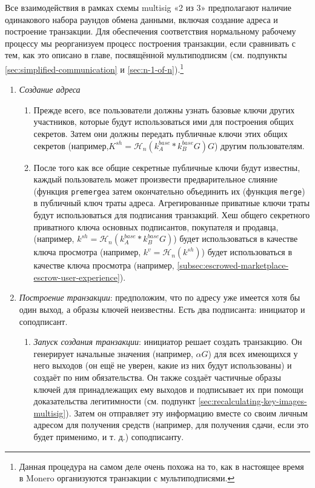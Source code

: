 Все взаимодействия в рамках схемы multisig «2 из 3» предполагают наличие одинакового набора раундов обмена данными, включая создание адреса и построение транзакции. Для обеспечения соответствия нормальному рабочему процессу мы реорганизуем процесс построе\-ния транзакции, если сравнивать с тем, как это описано в главе, посвящённой мультиподписям (см. подпункты \ref{sec:simplified-communication} и \ref{sec:n-1-of-n}).\footnote{Данная процедура на самом деле очень похожа на то, как в настоящее время в Monero организуются транзакции с мультиподписями.}
\begin{enumerate}
    \item {\em Создание адреса}
    \begin{enumerate}
        \item Прежде всего, все пользователи должны узнать базовые ключи других участников, которые будут использоваться ими для построения общих секретов. Затем они должны передать публичные ключи этих общих секретов (например,\linebreak $K^{sh} = \mathcal{H}_n(k^{base}_A*k^{base}_B G) G$) другим пользователям.
        \item После того как все общие секретные публичные ключи будут известны, каждый пользователь может произвести предварительное слияние (функция {\tt premerge}а за\-тем окончательно объединить их (функция {\tt merge}) в публичный ключ траты адреса. Агрегированные приватные ключи траты будут использоваться для подписания транзакций. Хеш общего секретного приватного ключа основных подписантов, покупателя и продавца, (например, $k^{sh} = \mathcal{H}_n(k^{base}_A*k^{base}_B G)$) будет использоваться в качестве ключа просмотра (например, $k^v = \mathcal{H}_n(k^{sh})$) будет использоваться в качестве ключа просмотра (например, \ref{subsec:escrowed-marketplace-escrow-user-experience}).
    \end{enumerate}{}
    \item {\em Построение транзакции}: предположим, что по адресу уже имеется хотя бы один выход, а образы ключей неизвестны. Есть два подписанта: инициатор и соподписант.
    \begin{enumerate}
        \item {\em Запуск создания транзакции}: инициатор решает создать транзакцию. Он генери\-рует начальные значения (например, $\alpha G$) для всех имеющихся у него выходов (он ещё не уверен, какие из них будут использованы) и создаёт по ним обязательства. Он также создаёт частичные образы ключей для принадлежащих ему выходов и подписывает их при помощи доказательства легитимности (см. подпункт \ref{sec:recalculating-key-images-multisig}). Затем он отправляет эту информацию вместе со своим личным адресом для получе\-ния средств (например, для получения сдачи, если это будет применимо, и т. д.) соподписанту.

\end{enumerate}
\end{enumerate}
